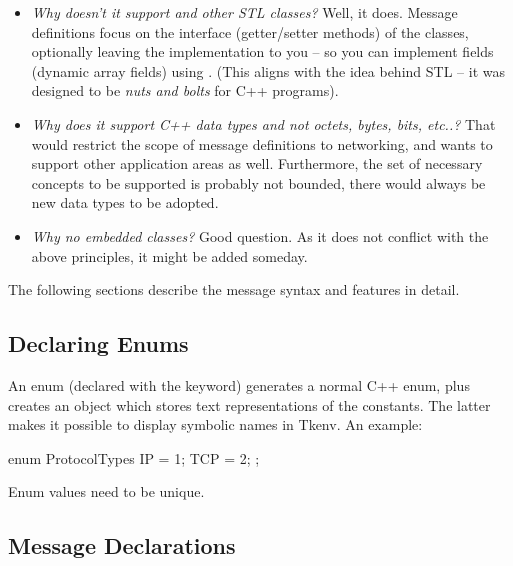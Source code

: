 \begin{itemize}
  \item{\textit{Why doesn't it support  and other STL classes?}
     Well, it does. Message definitions focus on the interface
     (getter/setter methods) of the classes, optionally leaving the implementation
     to you -- so you can implement fields (dynamic array fields)
     using .
     (This aligns with the idea behind STL -- it was designed to be
     \textit{nuts and bolts} for C++ programs).}
  \item{\textit{Why does it support C++ data types and not octets,
     bytes, bits, etc..?}
     That would restrict the scope of message definitions to networking,
     and {\opp} wants to support other application areas as well.
     Furthermore, the set of necessary concepts to be supported is
     probably not bounded, there would always be new data types to
     be adopted.}
  \item{\textit{Why no embedded classes?} Good question. As it does not
     conflict with the above principles, it might be added someday.}
\end{itemize}



The following sections describe the message syntax and features in detail.


\subsection{Declaring Enums}

An enum (declared with the  keyword) generates a normal C++
enum, plus creates an object which stores text representations of the
constants. The latter makes it possible to display symbolic names in Tkenv.
An example:

\begin{msg}
enum ProtocolTypes
{
   IP = 1;
   TCP = 2;
};
\end{msg}

Enum values need to be unique.


%

\subsection{Message Declarations}

